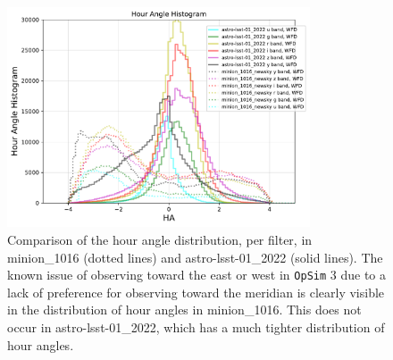 \documentclass[DM,lsstdraft,authoryear,toc]{lsstdoc}
\newcommand{\opsim}{\texttt{OpSim}\xspace}
\begin{document}
\begin{figure}[ht]
\centering
\includegraphics[width=0.8\textwidth]{figures/hour_angle_comparison}
\caption{Comparison of the hour angle distribution, per filter, in minion\_1016 (dotted lines) and astro-lsst-01\_2022 (solid lines). The known issue of observing toward the east 
or west in \opsim 3 due to a lack of preference for observing toward the meridian is clearly visible in the distribution of hour angles in minion\_1016. This does not occur in astro-lsst-01\_2022, which has a much tighter distribution of hour angles.
\label{fig:hour_angle_comparison}}
\end{figure}
\end{document}

